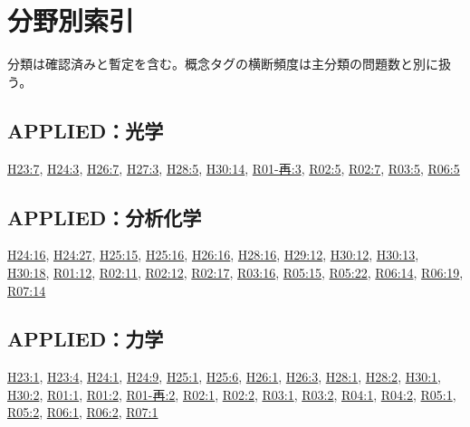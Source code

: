 \chapter{分野別索引}
分類は確認済みと暫定を含む。概念タグの横断頻度は主分類の問題数と別に扱う。
\section{APPLIED：光学}
\hyperref[q:h23-reg-applied-07]{H23:7}, \hyperref[q:h24-reg-applied-03]{H24:3}, \hyperref[q:h26-reg-applied-07]{H26:7}, \hyperref[q:h27-reg-applied-03]{H27:3}, \hyperref[q:h28-reg-applied-05]{H28:5}, \hyperref[q:h30-reg-applied-14]{H30:14}, \hyperref[q:r01-ret-applied-03]{R01-再:3}, \hyperref[q:r02-reg-applied-05]{R02:5}, \hyperref[q:r02-reg-applied-07]{R02:7}, \hyperref[q:r03-reg-applied-05]{R03:5}, \hyperref[q:r06-reg-applied-05]{R06:5}
\section{APPLIED：分析化学}
\hyperref[q:h24-reg-applied-16]{H24:16}, \hyperref[q:h24-reg-applied-27]{H24:27}, \hyperref[q:h25-reg-applied-15]{H25:15}, \hyperref[q:h25-reg-applied-16]{H25:16}, \hyperref[q:h26-reg-applied-16]{H26:16}, \hyperref[q:h28-reg-applied-16]{H28:16}, \hyperref[q:h29-reg-applied-12]{H29:12}, \hyperref[q:h30-reg-applied-12]{H30:12}, \hyperref[q:h30-reg-applied-13]{H30:13}, \hyperref[q:h30-reg-applied-18]{H30:18}, \hyperref[q:r01-reg-applied-12]{R01:12}, \hyperref[q:r02-reg-applied-11]{R02:11}, \hyperref[q:r02-reg-applied-12]{R02:12}, \hyperref[q:r02-reg-applied-17]{R02:17}, \hyperref[q:r03-reg-applied-16]{R03:16}, \hyperref[q:r05-reg-applied-15]{R05:15}, \hyperref[q:r05-reg-applied-22]{R05:22}, \hyperref[q:r06-reg-applied-14]{R06:14}, \hyperref[q:r06-reg-applied-19]{R06:19}, \hyperref[q:r07-reg-applied-14]{R07:14}
\section{APPLIED：力学}
\hyperref[q:h23-reg-applied-01]{H23:1}, \hyperref[q:h23-reg-applied-04]{H23:4}, \hyperref[q:h24-reg-applied-01]{H24:1}, \hyperref[q:h24-reg-applied-09]{H24:9}, \hyperref[q:h25-reg-applied-01]{H25:1}, \hyperref[q:h25-reg-applied-06]{H25:6}, \hyperref[q:h26-reg-applied-01]{H26:1}, \hyperref[q:h26-reg-applied-03]{H26:3}, \hyperref[q:h28-reg-applied-01]{H28:1}, \hyperref[q:h28-reg-applied-02]{H28:2}, \hyperref[q:h30-reg-applied-01]{H30:1}, \hyperref[q:h30-reg-applied-02]{H30:2}, \hyperref[q:r01-reg-applied-01]{R01:1}, \hyperref[q:r01-reg-applied-02]{R01:2}, \hyperref[q:r01-ret-applied-02]{R01-再:2}, \hyperref[q:r02-reg-applied-01]{R02:1}, \hyperref[q:r02-reg-applied-02]{R02:2}, \hyperref[q:r03-reg-applied-01]{R03:1}, \hyperref[q:r03-reg-applied-02]{R03:2}, \hyperref[q:r04-reg-applied-01]{R04:1}, \hyperref[q:r04-reg-applied-02]{R04:2}, \hyperref[q:r05-reg-applied-01]{R05:1}, \hyperref[q:r05-reg-applied-02]{R05:2}, \hyperref[q:r06-reg-applied-01]{R06:1}, \hyperref[q:r06-reg-applied-02]{R06:2}, \hyperref[q:r07-reg-applied-01]{R07:1}
